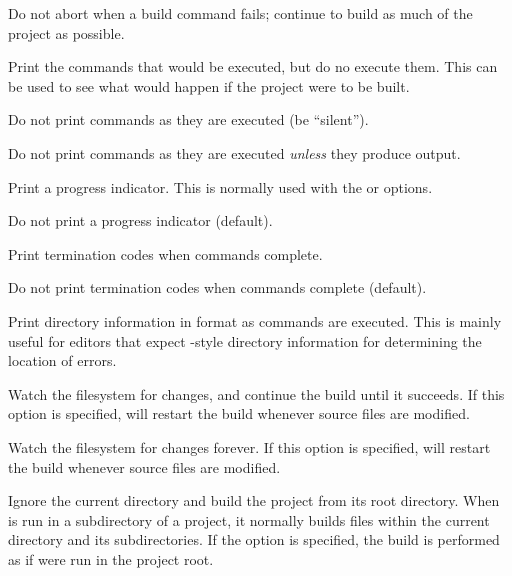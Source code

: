 \begin{description}\setlength{\itemsep}{0cm}
\item[\Opt{-k}] Do not abort when a build command fails;
continue to build as much of the project as possible.

\item[\Opt{-n}] Print the commands that would be executed, but do no execute them.
This can be used to see what would happen if the project were to be built.

\item[\Opt{-s}] Do not print commands as they are executed (be ``silent'').

\item[\Opt{-S}] Do not print commands as they are executed \emph{unless} they produce output.

\item[\Opt{-{}-progress}] Print a progress indicator.
This is normally used with the  or  options.

\item[\Opt{-{}-no-progress}] Do not print a progress indicator (default).

\item[\Opt{-{}-print-exit}] Print termination codes when commands complete.

\item[\Opt{-{}-no-print-exit}] Do not print termination codes when commands complete (default).

\item[\Opt{-w}] Print directory information in  format as commands are executed.
This is mainly useful for editors that expect -style
directory information for determining the location of errors.

\item[\Opt{-p}] Watch the filesystem for changes, and continue the build until it succeeds.  If this
option is specified,  will restart the build whenever source files are modified.

\item[\Opt{-P}] Watch the filesystem for changes forever.  If this option is specified, 
will restart the build whenever source files are modified.

\item[\Opt{-R}] Ignore the current directory and build the project from its root directory.  When
 is run in a subdirectory of a project, it normally builds files within the current
directory and its subdirectories.  If the  option is specified, the build is performed as if
 were run in the project root.


\end{description}
